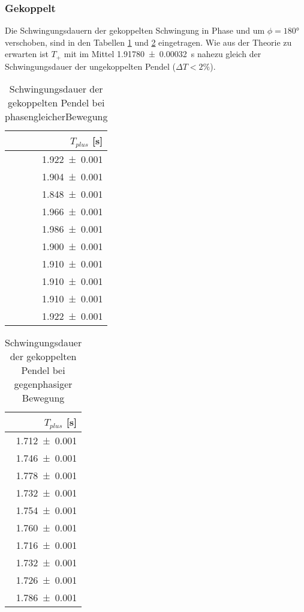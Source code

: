 \subsubsection{Gekoppelt}
Die Schwingungsdauern der gekoppelten Schwingung in Phase und um $\phi=180°$
verschoben, sind in den Tabellen \ref{tab:l1t+} und \ref{tab:l1t-}
eingetragen. Wie aus der Theorie zu erwarten ist $T_+$ mit im
Mittel \SI{1.91780+-0.00032}{\second} nahezu gleich der Schwingungsdauer
der ungekoppelten Pendel ($\Delta T < 2\%$).
\begin{table}[H]
 \centering
 \caption{Schwingungsdauer der gekoppelten
 Pendel bei phasengleicherBewegung}
 \label{tab:l1t+}
 \begin{tabular}{r}
 \toprule
  {$T_{plus}$ [\si{\second}]} \\
 \midrule
    \num{1.922 +- 0.001}\\
    \num{1.904 +- 0.001}\\
    \num{1.848 +- 0.001}\\
    \num{1.966 +- 0.001}\\
    \num{1.986 +- 0.001}\\
    \num{1.900 +- 0.001}\\
    \num{1.910 +- 0.001}\\
    \num{1.910 +- 0.001}\\
    \num{1.910 +- 0.001}\\
    \num{1.922 +- 0.001}\\
 \bottomrule
 \end{tabular}
\end{table}

\begin{table}[H]
 \centering
 \caption{Schwingungsdauer der gekoppelten
 Pendel bei gegenphasiger Bewegung}
 \label{tab:l1t-}
 \begin{tabular}{r}
 \toprule
  {$T_{plus}$ [\si{\second}]} \\
 \midrule
    \num{1.712 +- 0.001}\\
    \num{1.746 +- 0.001}\\
    \num{1.778 +- 0.001}\\
    \num{1.732 +- 0.001}\\
    \num{1.754 +- 0.001}\\
    \num{1.760 +- 0.001}\\
    \num{1.716 +- 0.001}\\
    \num{1.732 +- 0.001}\\
    \num{1.726 +- 0.001}\\
    \num{1.786 +- 0.001}\\
 \bottomrule
 \end{tabular}
\end{table}

